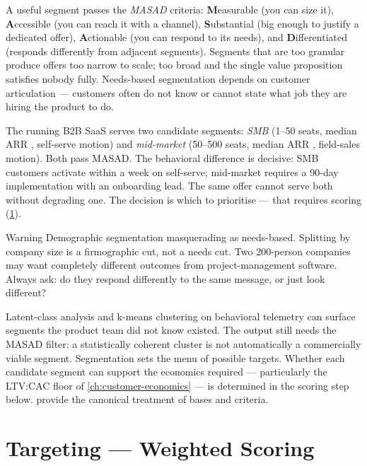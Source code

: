 A useful segment passes the \emph{MASAD} criteria: \textbf{M}easurable (you can size it), \textbf{A}ccessible (you can reach it with a channel), \textbf{S}ubstantial (big enough to justify a dedicated offer), \textbf{A}ctionable (you can respond to its needs), and \textbf{D}ifferentiated (responds differently from adjacent segments). Segments that are too granular produce offers too narrow to scale; too broad and the single value proposition satisfies nobody fully. Needs-based segmentation depends on customer articulation --- customers often do not know or cannot state what job they are hiring the product to do.

\begin{example}
The running B2B SaaS serves two candidate segments: \emph{SMB} (1--50 seats, median ARR , self-serve motion) and \emph{mid-market} (50--500 seats, median ARR , field-sales motion). Both pass MASAD. The behavioral difference is decisive: SMB customers activate within a week on self-serve; mid-market requires a 90-day implementation with an onboarding lead. The same offer cannot serve both without degrading one. The decision is which to prioritise --- that requires scoring (\cref{sec:targeting}).
\end{example}

\begin{admonition}{Warning}
Demographic segmentation masquerading as needs-based. Splitting by company size is a firmographic cut, not a needs cut. Two 200-person companies may want completely different outcomes from project-management software. Always ask: do they respond differently to the same message, or just look different?
\end{admonition}

Latent-class analysis and k-means clustering on behavioral telemetry can surface segments the product team did not know existed. The output still needs the MASAD filter: a statistically coherent cluster is not automatically a commercially viable segment. Segmentation sets the menu of possible targets. Whether each candidate segment can support the economics required --- particularly the LTV:CAC floor of \cref{ch:customer-economics} --- is determined in the scoring step below. \textcite{kotler2021} provide the canonical treatment of bases and criteria.

\section{Targeting --- Weighted Scoring}\label{sec:targeting}

